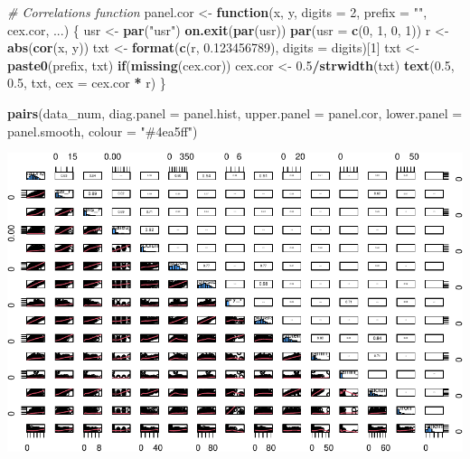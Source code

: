 \documentclass[
]{article}
\newenvironment{Shaded}{\begin{snugshade}}{\end{snugshade}}
\newcommand{\AttributeTok}[1]{\textcolor[rgb]{0.13,0.29,0.53}{#1}}
\newcommand{\CommentTok}[1]{\textcolor[rgb]{0.56,0.35,0.01}{\textit{#1}}}
\newcommand{\ControlFlowTok}[1]{\textcolor[rgb]{0.13,0.29,0.53}{\textbf{#1}}}
\newcommand{\DecValTok}[1]{\textcolor[rgb]{0.00,0.00,0.81}{#1}}
\newcommand{\FloatTok}[1]{\textcolor[rgb]{0.00,0.00,0.81}{#1}}
\newcommand{\FunctionTok}[1]{\textcolor[rgb]{0.13,0.29,0.53}{\textbf{#1}}}
\newcommand{\NormalTok}[1]{#1}
\newcommand{\OtherTok}[1]{\textcolor[rgb]{0.56,0.35,0.01}{#1}}
\newcommand{\SpecialCharTok}[1]{\textcolor[rgb]{0.81,0.36,0.00}{\textbf{#1}}}
\newcommand{\StringTok}[1]{\textcolor[rgb]{0.31,0.60,0.02}{#1}}
\begin{document}
\begin{Shaded}
\begin{Highlighting}[]
\CommentTok{\# Correlations function}
\NormalTok{panel.cor }\OtherTok{\textless{}{-}} \ControlFlowTok{function}\NormalTok{(x, y, }\AttributeTok{digits =} \DecValTok{2}\NormalTok{, }\AttributeTok{prefix =} \StringTok{""}\NormalTok{, cex.cor, ...)}
\NormalTok{\{}
\NormalTok{  usr }\OtherTok{\textless{}{-}} \FunctionTok{par}\NormalTok{(}\StringTok{"usr"}\NormalTok{)}
  \FunctionTok{on.exit}\NormalTok{(}\FunctionTok{par}\NormalTok{(usr))}
  \FunctionTok{par}\NormalTok{(}\AttributeTok{usr =} \FunctionTok{c}\NormalTok{(}\DecValTok{0}\NormalTok{, }\DecValTok{1}\NormalTok{, }\DecValTok{0}\NormalTok{, }\DecValTok{1}\NormalTok{))}
\NormalTok{  r }\OtherTok{\textless{}{-}} \FunctionTok{abs}\NormalTok{(}\FunctionTok{cor}\NormalTok{(x, y))}
\NormalTok{  txt }\OtherTok{\textless{}{-}} \FunctionTok{format}\NormalTok{(}\FunctionTok{c}\NormalTok{(r, }\FloatTok{0.123456789}\NormalTok{), }\AttributeTok{digits =}\NormalTok{ digits)[}\DecValTok{1}\NormalTok{]}
\NormalTok{  txt }\OtherTok{\textless{}{-}} \FunctionTok{paste0}\NormalTok{(prefix, txt)}
  \ControlFlowTok{if}\NormalTok{(}\FunctionTok{missing}\NormalTok{(cex.cor)) cex.cor }\OtherTok{\textless{}{-}} \FloatTok{0.5}\SpecialCharTok{/}\FunctionTok{strwidth}\NormalTok{(txt)}
  \FunctionTok{text}\NormalTok{(}\FloatTok{0.5}\NormalTok{, }\FloatTok{0.5}\NormalTok{, txt, }\AttributeTok{cex =}\NormalTok{ cex.cor }\SpecialCharTok{*}\NormalTok{ r)}
\NormalTok{\}}
\end{Highlighting}
\end{Shaded}

\begin{Shaded}
\begin{Highlighting}[]
\FunctionTok{pairs}\NormalTok{(data\_num, }
      \AttributeTok{diag.panel =}\NormalTok{ panel.hist,}
      \AttributeTok{upper.panel =}\NormalTok{ panel.cor, }
      \AttributeTok{lower.panel =}\NormalTok{ panel.smooth,}
      \AttributeTok{colour =} \StringTok{"\#4ea5ff"}\NormalTok{)}
\end{Highlighting}
\end{Shaded}

\begin{center}\includegraphics{Statistical_Learning_Final_Report_files/figure-latex/pairplot-1} \end{center}
\end{document}
